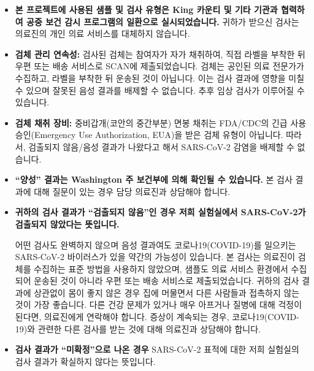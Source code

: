 \documentclass[10pt]{article}
\begin{document}
\begin{itemize}
\item

  \textbf{본 프로젝트에 사용된 샘플 및 검사 유형은 King 카운티 및 기타 기관과 협력하여 공중 보건
  감시 프로그램의 일환으로 실시되었습니다.} 귀하가 받으신 검사는 의료진의 개인 의료 서비스를
  대체하지 않습니다.

\item

  \textbf{검체 관리 연속성:} 검사된 검체는 참여자가 자가 채취하여, 직접 라벨을 부착한 뒤 우편
  또는 배송 서비스로 SCAN에 제출되었습니다. 검체는 공인된 의료 전문가가 수집하고, 라벨을 부착한
  뒤 운송된 것이 아닙니다. 이는 검사 결과에 영향을 미칠 수 있으며 잘못된 음성 결과를 배제할 수
  없습니다. 추후 임상 검사가 이루어질 수 있습니다.

\item

  \textbf{검체 채취 장비:} 중비갑개(코안의 중간부분) 면봉 채취는 FDA/CDC의 긴급 사용
  승인(Emergency Use Authorization, EUA)을 받은 검체 유형이 아닙니다. 따라서, 검출되지
  않음/음성 결과가 나왔다고 해서 SARS-CoV-2 감염을 배제할 수 없습니다.

\item

  \textbf{``양성'' 결과는 Washington 주 보건부에 의해 확인될 수 있습니다.} 본 검사 결과에
  대해 질문이 있는 경우 담당 의료진과 상담해야 합니다.

\item{
  \textbf{귀하의 검사 결과가 ``검출되지 않음''인 경우 저희 실험실에서 SARS-CoV-2가 검출되지
  않았다는 뜻입니다.}

  어떤 검사도 완벽하지 않으며 음성 결과여도 코로나19(COVID-19)를 일으키는 SARS-CoV-2
  바이러스가 있을 약간의 가능성이 있습니다.  본 검사는 의료진이 검체를 수집하는 표준 방법을
  사용하지 않았으며, 샘플도 의료 서비스 환경에서 수집되어 운송된 것이 아니라 우편 또는 배송 서비스로
  제출되었습니다.  귀하의 검사 결과에 상관없이 몸이 좋지 않은 경우 집에 머물면서 다른 사람들과
  접촉하지 않는 것이 가장 좋습니다. 다른 건강 문제가 있거나 매우 아프거나 질병에 대해 걱정이
  된다면, 의료진에게 연락해야 합니다.  증상이 계속되는 경우, 코로나19(COVID-19)와 관련한 다른
  검사를 받는 것에 대해 의료진과 상담해야 합니다.
}

\item

  \textbf{검사 결과가 ``미확정''으로 나온 경우} SARS-CoV-2 표적에 대한 저희 실험실의 검사
  결과가 확실하지 않다는 뜻입니다.


\end{itemize}
\end{document}
